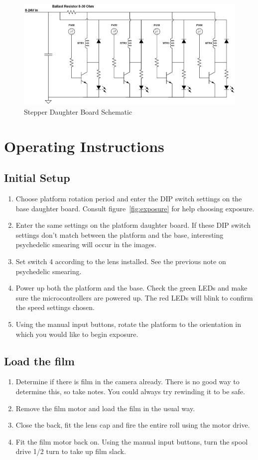 \documentclass[dvips,12pt]{article}
\begin{document}
\begin{figure}[h]
\centering
\includegraphics[width=\textwidth]{stepperdriver}
\caption{Stepper Daughter Board Schematic}
\label{fig:Panoramicam}
\end{figure}

\section{Operating Instructions}

\subsection{Initial Setup}
\begin{enumerate}
\item Choose platform rotation period and enter the DIP switch settings on
the base daughter board. Consult figure~\ref{fig:exposure} for help choosing exposure.
\item Enter the same settings on the platform daughter board. If these DIP switch settings don't match between the platform and the base, interesting psychedelic smearing will occur in the images.
\item Set switch 4 according to the lens installed. See the previous note on psychedelic smearing. 
\item Power up both the platform and the base. Check the green LEDs and
make sure the microcontrollers are powered up. The red LEDs will blink to
confirm the speed settings chosen. 
\item Using the manual input buttons, rotate the platform to the orientation in which you would like to begin exposure. 
\end{enumerate}

\subsection{Load the film}
\begin{enumerate}
\item Determine if there is film in the camera already. There is no good way to determine this, so take notes. You could always try rewinding it to be safe.
\item Remove the film motor and load the film in the usual way.
\item Close the back, fit the lens cap and fire the entire roll using the motor drive.
\item Fit the film motor back on. Using the manual input buttons, turn the spool drive 1/2 turn to take up film slack.
\end{enumerate}
\end{document}
